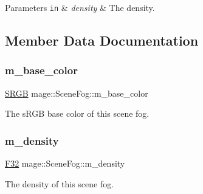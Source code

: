 \begin{DoxyParams}[1]{Parameters}
\mbox{\tt in}  & {\em density} & The density. \\
\hline
\end{DoxyParams}


\subsection{Member Data Documentation}
\hypertarget{classmage_1_1_scene_fog_aa5440867e5dc3dda9532899e98ff44ae}{}\label{classmage_1_1_scene_fog_aa5440867e5dc3dda9532899e98ff44ae} 
\subsubsection{\texorpdfstring{m\+\_\+base\+\_\+color}{m\_base\_color}}
{\footnotesize\ttfamily \hyperlink{structmage_1_1_s_r_g_b}{S\+R\+GB} mage\+::\+Scene\+Fog\+::m\+\_\+base\+\_\+color\hspace{0.3cm}{\ttfamily [private]}}

The s\+R\+GB base color of this scene fog. \hypertarget{classmage_1_1_scene_fog_a16d4e67f373716f100ed6809c387b74c}{}\label{classmage_1_1_scene_fog_a16d4e67f373716f100ed6809c387b74c} 
\subsubsection{\texorpdfstring{m\+\_\+density}{m\_density}}
{\footnotesize\ttfamily \hyperlink{namespacemage_aa97e833b45f06d60a0a9c4fc22ae02c0}{F32} mage\+::\+Scene\+Fog\+::m\+\_\+density\hspace{0.3cm}{\ttfamily [private]}}

The density of this scene fog. 